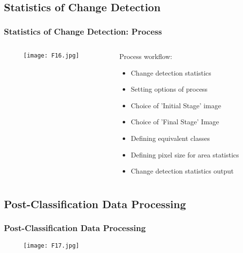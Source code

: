 \documentclass[pdflatex,compress,8pt,
	xcolor={dvipsnames,dvipsnames,svgnames,x11names,table},
	hyperref={colorlinks = true,breaklinks = true, urlcolor = NavyBlue, breaklinks = true}]{beamer}
\begin{document}
\subsection{Statistics of Change Detection}
\begin{frame}\frametitle{Statistics of Change Detection: Process}
\begin{minipage}[0.4\textheight]{\textwidth}
\begin{columns}[T]
\begin{column}{0.7\textwidth}
\begin{figure}[H]
	\centering
		\texttt{[image: F16.jpg]}
\end{figure}
\end{column}
\begin{column}{0.3\textwidth}
Process workflow:
\begin{itemize}
	\item Change detection statistics
	\item Setting options of process
	\item Choice of 'Initial Stage' image
	\item Choice of 'Final Stage' Image
	\item Defining equivalent classes
	\item Defining pixel size for area statistics
	\item Change detection statistics output
\end{itemize}
\end{column}
\end{columns}
\end{minipage}
\end{frame}

\subsection{Post-Classification Data Processing}
\begin{frame}\frametitle{ Post-Classification Data Processing}
\begin{figure}[H]
	\centering
		\texttt{[image: F17.jpg]}
\end{figure}
\end{frame}
\end{document}
